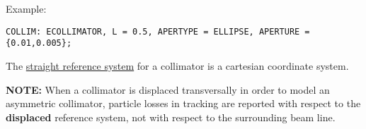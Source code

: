 Example: 
\begin{verbatim}
COLLIM: ECOLLIMATOR, L = 0.5, APERTYPE = ELLIPSE, APERTURE = {0.01,0.005};
\end{verbatim}

The \href{local_system.html#straight}{straight reference system} for a
collimator is a cartesian coordinate system.  

\textbf{NOTE:} When a collimator is displaced transversally in order to
model  an asymmetric collimator, particle losses in tracking are
reported with respect to the \textbf{displaced} reference system, not
with respect to the surrounding beam line.  



